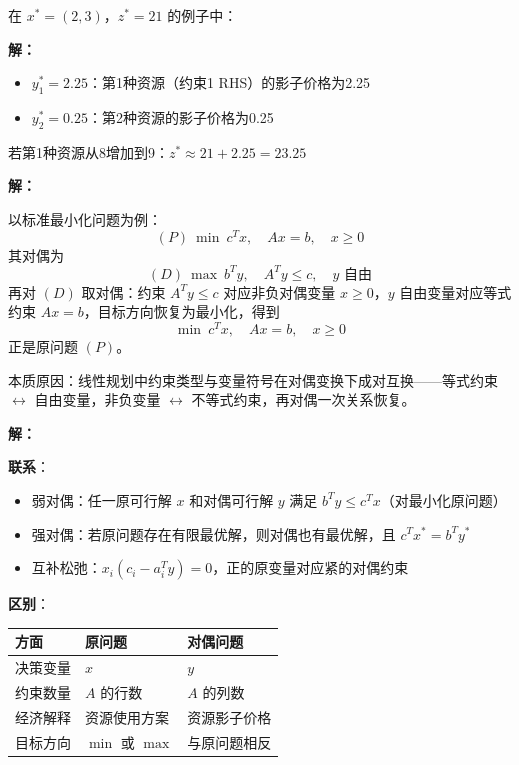 \begin{example}[影子价格]
在 $x^* = (2, 3)$，$z^* = 21$ 的例子中：

\textbf{解：}

\begin{itemize}
    \item $y_1^* = 2.25$：第1种资源（约束1 RHS）的影子价格为2.25
    \item $y_2^* = 0.25$：第2种资源的影子价格为0.25
\end{itemize}

若第1种资源从8增加到9：$z^* \approx 21 + 2.25 = 23.25$
\end{example}

\begin{example}[对偶的对偶是原问题]\label{ex:dual-of-dual}

\textbf{解：}

以标准最小化问题为例：
\[
(P)\ \min\ c^T x, \quad Ax = b, \quad x \geq 0
\]
其对偶为
\[
(D)\ \max\ b^T y, \quad A^T y \leq c, \quad y \text{ 自由}
\]
再对 $(D)$ 取对偶：约束 $A^T y \leq c$ 对应非负对偶变量 $x \geq 0$，$y$ 自由变量对应等式约束 $Ax = b$，目标方向恢复为最小化，得到
\[
\min\ c^T x, \quad Ax = b, \quad x \geq 0
\]
正是原问题 $(P)$。

本质原因：线性规划中约束类型与变量符号在对偶变换下成对互换——等式约束 $\leftrightarrow$ 自由变量，非负变量 $\leftrightarrow$ 不等式约束，再对偶一次关系恢复。
\end{example}

\begin{example}[原问题与对偶问题的联系与区别]\label{ex:primal-dual-comparison}

\textbf{解：}

\textbf{联系}：
\begin{itemize}[itemsep=0.2em]
    \item 弱对偶：任一原可行解 $x$ 和对偶可行解 $y$ 满足 $b^T y \leq c^T x$（对最小化原问题）
    \item 强对偶：若原问题存在有限最优解，则对偶也有最优解，且 $c^T x^* = b^T y^*$
    \item 互补松弛：$x_i(c_i - a_i^T y) = 0$，正的原变量对应紧的对偶约束
\end{itemize}

\textbf{区别}：
\begin{center}
\begin{tabular}{@{}lll@{}}
\toprule
方面 & 原问题 & 对偶问题 \\
\midrule
决策变量 & $x$ & $y$ \\
约束数量 & $A$ 的行数 & $A$ 的列数 \\
经济解释 & 资源使用方案 & 资源影子价格 \\
目标方向 & $\min$ 或 $\max$ & 与原问题相反 \\
\bottomrule
\end{tabular}
\end{center}
\end{example}

